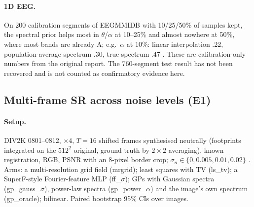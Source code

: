 \paragraph{1D EEG.} On 200 calibration segments of EEGMMIDB
\citep{schalk2009eeg,schalk2004bci2000} with 10/25/50\% of samples
kept, the spectral prior helps most in $\theta$/$\alpha$ at 10--25\% and
almost nowhere at 50\%, where most bands are already A; e.g.\ $\alpha$ at
10\%: linear interpolation .22, population-average spectrum .30, true
spectrum .47 . These are calibration-only numbers from the original report. The 760-segment test result has not been recovered and is not counted as confirmatory evidence here.

\subsection{Multi-frame SR across noise levels (E1)}\label{sec:exp-ab}

\paragraph{Setup.} DIV2K 0801--0812, $\times4$, $T=16$ shifted frames
synthesised neutrally (footprints integrated on the $512^2$ original, ground
truth by $2\times2$ averaging), known registration, RGB, PSNR with an 8-pixel
border crop; $\sigma_n\in\{0,0.005,0.01,0.02\}$ . Arms: a
multi-resolution grid field (mrgrid); least squares with TV (ls\_tv); a
SuperF-style Fourier-feature MLP (ff\_$\sigma$); GPs with Gaussian spectra
(gp\_gauss\_$\sigma$), power-law spectra (gp\_power\_$\alpha$) and the
image's own spectrum (gp\_oracle); bilinear. Paired bootstrap 95\% CIs over
images.

